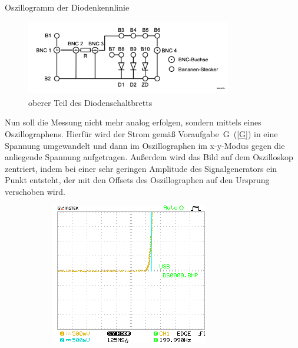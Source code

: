 \documentclass{article}
\theoremstyle{definition}
\begin{document}
\begin{aufgabe}{Oszillogramm der Diodenkennlinie}
    \aufbau
    \begin{figure}[H]
        \centering
        \includegraphics[width=0.8\textwidth]{figs/Aufbau2.png}
        \caption{oberer Teil des Diodenschaltbretts\cite{anleitung}}
        \label{aufbau_2_2}
    \end{figure}
Nun soll die Messung nicht mehr analog erfolgen, sondern mittels eines Oszillographens. Hierfür wird der Strom gemäß Voraufgabe~G~(\ref{G}) in eine Spannung umgewandelt und dann im Oszillographen im x-y-Modus gegen die anliegende Spannung aufgetragen. Außerdem wird das Bild auf dem Oszilloskop zentriert, indem bei einer sehr geringen Amplitude des Signalgenerators ein Punkt entsteht, der mit den Offsets des Oszillographen auf den Ursprung verschoben wird.
    \messwerte 
    \begin{figure}[H]
        \centering
        \begin{subfigure}[b]{0.45 \textwidth}
            \includegraphics[width=\textwidth]{MesswerteVersuch2/m2_0.png}

\end{subfigure}
\end{figure}
\end{aufgabe}
\end{document}
